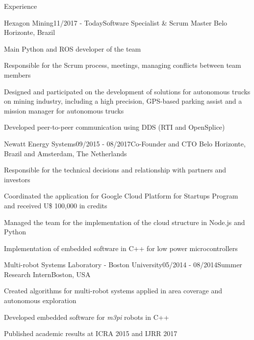 \documentclass[14pt, a4paper]{resume} %
\begin{document}
\begin{rSection}{Experience}


\begin{rSubsection}{Hexagon Mining}{11/2017 - Today}{\normalfont Software Specialist \& Scrum Master}{ \normalfont Belo Horizonte, Brazil}
 	\item Main Python and ROS developer of the team
 	\item Responsible for the Scrum process, meetings, managing conflicts between team members
 	\item Designed and participated on the development of solutions for autonomous trucks on mining industry, including a high precision, GPS-based parking assist and a mission manager for autonomous trucks
 	\item Developed peer-to-peer communication using DDS (RTI and OpenSplice)
\end{rSubsection}

\begin{rSubsection}{Newatt Energy Systems}{09/2015 - 08/2017}{\normalfont Co-Founder and CTO}{ \normalfont Belo Horizonte, Brazil and Amsterdam, The Netherlands}
 	\item Responsible for the technical decisions and relationship with partners and investors
 	\item Coordinated the application for Google Cloud Platform for Startups Program and received U\$ 100,000 in credits
 	\item Managed the team for the implementation of the cloud structure in Node.js and Python
 	\item Implementation of embedded software in C++ for low power microcontrollers
\end{rSubsection}

\begin{rSubsection}{Multi-robot Systems Laboratory - Boston University}{05/2014 - 08/2014}{\normalfont Summer Research Intern}{\normalfont Boston,  USA}
	\item Created algorithms for multi-robot systems applied in area coverage and autonomous exploration 
	\item Developed embedded software for \textit{m3pi} robots in C++
	\item Published academic results at ICRA 2015 and IJRR 2017
\end{rSubsection}



\end{rSection}
\end{document}
